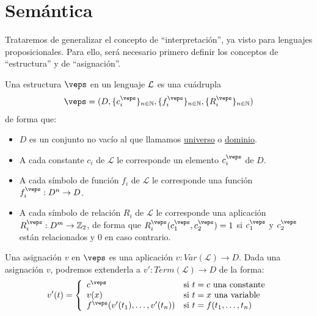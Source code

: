 \section{Semántica}
Trataremos de generalizar el concepto de ``interpretación'', ya visto para lenguajes proposicionales. Para ello, será necesario primero definir los conceptos de ``estructura'' y de ``asignación''.

\begin{definicion}[Estructura]
    Una estructura $\veps$ en un lenguaje $\mathcal{L}$ es una cuádrupla
    \begin{equation*}
        \veps = (D, \{c_i^\veps\}_{n\in \mathbb{N}}, \{f_i^\veps\}_{n\in \mathbb{N}}, \{R_i^\veps\}_{n\in \mathbb{N}})
    \end{equation*}
    de forma que:
    \begin{itemize}
        \item $D$ es un conjunto no vacío al que llamamos \underline{universo} o \underline{dominio}.
        \item A cada constante $c_i$ de $\mathcal{L}$ le corresponde un elemento $c_i^{\veps}$ de $D$.
        \item A cada símbolo de función $f_i$ de $\mathcal{L}$ le corresponde una función $f_i^\veps:D^n\to D$.
        \item A cada símbolo de relación $R_i$ de $\mathcal{L}$ le corresponde una aplicación ${R_i^\veps:D^m\to\mathbb{Z}_2}$, de forma que $R_i^\veps(c_1^\veps,c_2^\veps)=1$ si $c_1^\veps$ y $c_2^\veps$ están relacionados y 0 en caso contrario.
    \end{itemize}
\end{definicion}

\begin{definicion}[Asignación]
    Una asignación $v$ en $\veps$ es una aplicación ${v:Var(\mathcal{L})\to D}$. Dada una asignación $v$, podremos extenderla a $v':Term(\mathcal{L})\to D$ de la forma:
    \begin{equation*}
        v'(t) = \left\{\begin{array}{ll}
                c^\veps & \text{si\ } t=c \text{\ una constante} \\
                v(x) & \text{si\ } t=x \text{\ una variable} \\
                f^\veps(v'(t_1),\ldots,v'(t_n)) &\text{si\ } t=f(t_1,\ldots,t_n)
        \end{array}\right.
    \end{equation*}
\end{definicion}

